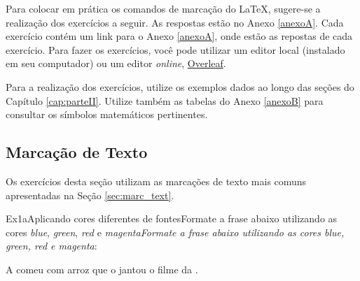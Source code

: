 Para colocar em prática os comandos de marcação do \LaTeX{}, sugere-se a realização dos exercícios a seguir. As respostas estão no Anexo \ref{anexoA}. Cada exercício contém um link para o Anexo \ref{anexoA}, onde estão as repostas de cada exercício. Para fazer os exercícios, você pode utilizar um editor local (instalado em seu computador) ou um editor \textit{online}, \href{https://pt.overleaf.com/project}{Overleaf}.

Para a realização dos exercícios, utilize os exemplos dados ao longo das seções do Capítulo \ref{cap:parteII}. Utilize também as tabelas do Anexo \ref{anexoB} para consultar os símbolos matemáticos pertinentes.

\tcbstartrecording

\subsection*{Marcação de Texto}
\label{sec:exec_mar_text}

Os exercícios desta seção utilizam as marcações de texto mais comuns apresentadas na Seção \ref{sec:marc_text}.


\begin{texercise}{Ex1a}{Aplicando cores diferentes de fontes}{Formate a frase abaixo utilizando as cores \textit{blue}, \textit{green}, \textit{red} e \textit{magenta}}\textit{Formate a frase abaixo utilizando as cores \textit{blue}, \textit{green}, \textit{red} e \textit{magenta}}:\par\smallskip%
\begin{tcboutputlisting}
\begin{center}
    A \color{blue}{famosa} \color{green}{Kelly} comeu 
    \color{red}{pão infetado} com arroz que o \color{magenta}{Barriga}
    jantou \color{blue}{vendo} o filme da \color{green}{Wehrmacht}
    \color{red}{xexelenta}.
\end{center}
\end{tcboutputlisting}
\tcbuselistingtext%
\end{texercise}

